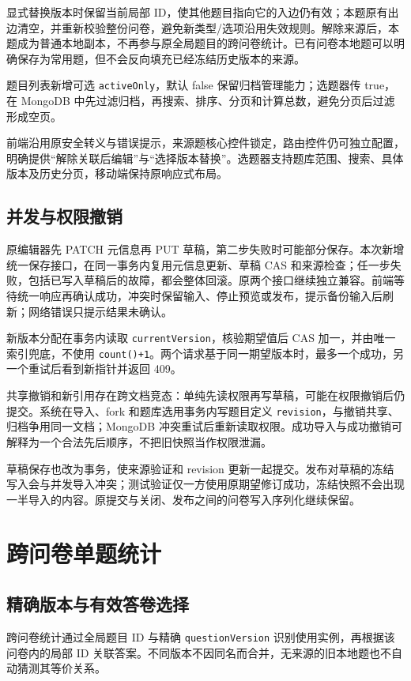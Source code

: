 \documentclass[UTF8,10pt,a4paper,twocolumn,fontset=none]{ctexart}
\begin{document}
显式替换版本时保留当前局部 ID，使其他题目指向它的入边仍有效；本题原有出边清空，并重新校验整份问卷，避免新类型/选项沿用失效规则。解除来源后，本题成为普通本地副本，不再参与原全局题目的跨问卷统计。已有问卷本地题可以明确保存为常用题，但不会反向填充已经冻结历史版本的来源。

题目列表新增可选 \texttt{activeOnly}，默认 false 保留归档管理能力；选题器传 true，在 MongoDB 中先过滤归档，再搜索、排序、分页和计算总数，避免分页后过滤形成空页。

前端沿用原安全转义与错误提示，来源题核心控件锁定，路由控件仍可独立配置，明确提供“解除关联后编辑”与“选择版本替换”。选题器支持题库范围、搜索、具体版本及历史分页，移动端保持原响应式布局。

\subsection{并发与权限撤销}
原编辑器先 PATCH 元信息再 PUT 草稿，第二步失败时可能部分保存。本次新增统一保存接口，在同一事务内复用元信息更新、草稿 CAS 和来源检查；任一步失败，包括已写入草稿后的故障，都会整体回滚。原两个接口继续独立兼容。前端等待统一响应再确认成功，冲突时保留输入、停止预览或发布，提示备份输入后刷新；网络错误只提示结果未确认。

新版本分配在事务内读取 \texttt{currentVersion}，核验期望值后 CAS 加一，并由唯一索引兜底，不使用 \texttt{count()+1}。两个请求基于同一期望版本时，最多一个成功，另一个重试后看到新指针并返回 409。

共享撤销和新引用存在跨文档竞态：单纯先读权限再写草稿，可能在权限撤销后仍提交。系统在导入、fork 和题库选用事务内写题目定义 \texttt{revision}，与撤销共享、归档争用同一文档；MongoDB 冲突重试后重新读取权限。成功导入与成功撤销可解释为一个合法先后顺序，不把旧快照当作权限泄漏。

草稿保存也改为事务，使来源验证和 revision 更新一起提交。发布对草稿的冻结写入会与并发导入冲突；测试验证仅一方使用原期望修订成功，冻结快照不会出现一半导入的内容。原提交与关闭、发布之间的问卷写入序列化继续保留。

\section{跨问卷单题统计}
\subsection{精确版本与有效答卷选择}
跨问卷统计通过全局题目 ID 与精确 \texttt{questionVersion} 识别使用实例，再根据该问卷内的局部 ID 关联答案。不同版本不因同名而合并，无来源的旧本地题也不自动猜测其等价关系。
\end{document}
